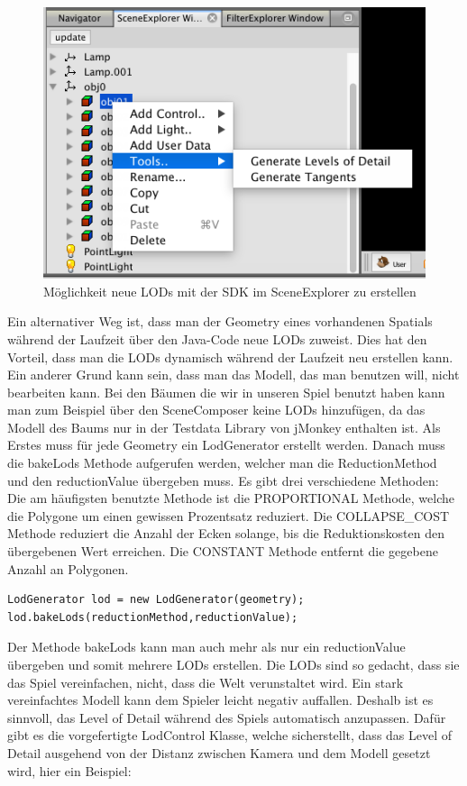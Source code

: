 \begin{center}
	\begin{figure}[h!]
		
		
		\caption{Möglichkeit neue LODs mit der SDK im SceneExplorer zu erstellen}
		
		\includegraphics[width=0.7\linewidth]{images/generateLOD.png}
		
	\end{figure}  
\end{center}

Ein alternativer Weg ist, dass man der Geometry eines vorhandenen Spatials während der Laufzeit über den Java-Code neue LODs zuweist. Dies hat den Vorteil, dass man die LODs dynamisch während der Laufzeit neu erstellen kann. Ein anderer Grund kann sein, dass man das Modell, das man benutzen will, nicht bearbeiten kann. Bei den Bäumen die wir in unseren Spiel benutzt haben kann man zum Beispiel über den SceneComposer keine LODs hinzufügen, da das Modell des Baums nur in der Testdata Library von jMonkey enthalten ist. 
Als Erstes muss für jede Geometry ein LodGenerator erstellt werden. Danach muss die bakeLods Methode aufgerufen werden, welcher man die ReductionMethod und den reductionValue übergeben muss. Es gibt drei verschiedene Methoden: Die am häufigsten benutzte Methode ist die PROPORTIONAL Methode, welche die Polygone um einen gewissen Prozentsatz reduziert. Die COLLAPSE\_COST Methode reduziert die Anzahl der Ecken solange, bis die Reduktionskosten den übergebenen Wert erreichen. Die CONSTANT Methode entfernt die gegebene Anzahl an Polygonen.
\begin{lstlisting}
LodGenerator lod = new LodGenerator(geometry);
lod.bakeLods(reductionMethod,reductionValue);
\end{lstlisting}

Der Methode bakeLods kann man auch mehr als nur ein reductionValue übergeben und somit mehrere LODs erstellen. Die LODs sind so gedacht, dass sie das Spiel vereinfachen, nicht, dass die Welt verunstaltet wird. Ein stark vereinfachtes Modell kann dem Spieler leicht negativ auffallen. Deshalb ist es sinnvoll, das Level of Detail während des Spiels automatisch anzupassen. Dafür gibt es die vorgefertigte LodControl Klasse, welche sicherstellt, dass das Level of Detail ausgehend von der Distanz zwischen Kamera und dem Modell gesetzt wird, hier ein Beispiel:

